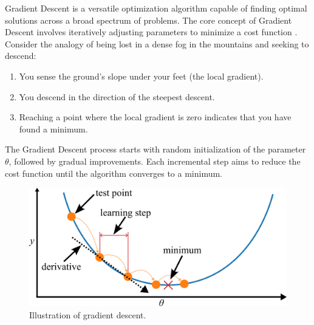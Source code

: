 \documentclass[12pt,letter]{article}
\begin{document}
%
%
%
%
%


Gradient Descent is a versatile optimization algorithm capable of finding optimal solutions across a broad spectrum of problems. The core concept of Gradient Descent involves iteratively adjusting parameters to minimize a cost function \protect\footnotemark[1]. Consider the analogy of being lost in a dense fog in the mountains and seeking to descend:
\begin{enumerate}
\item You sense the ground's slope under your feet (the local gradient).
\item You descend in the direction of the steepest descent.
\item Reaching a point where the local gradient is zero indicates that you have found a minimum.
\end{enumerate}
	


The Gradient Descent process starts with random initialization of the parameter $\theta$, followed by gradual improvements. Each incremental step aims to reduce the cost function until the algorithm converges to a minimum.

\begin{figure}[H]
    \centering
    \includegraphics[]{../figures/gradient_descent_1}
    \caption{Illustration of gradient descent.}
    \label{fig:gradient_descent_1}
\end{figure}
\end{document}
